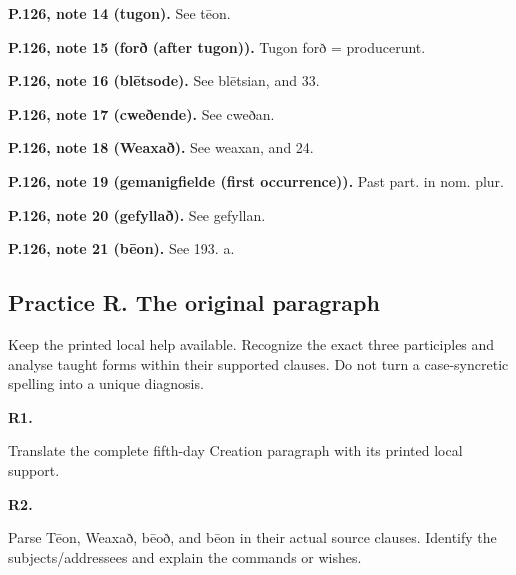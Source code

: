\textbf{P.126, note 14 (tugon).} See tēon.

\textbf{P.126, note 15 (forð (after tugon)).} Tugon forð = producerunt.

\textbf{P.126, note 16 (blētsode).} See blētsian, and 33.

\textbf{P.126, note 17 (cweðende).} See cweðan.

\textbf{P.126, note 18 (Weaxað).} See weaxan, and 24.

\textbf{P.126, note 19 (gemanigfielde (first occurrence)).} Past part. in nom. plur.

\textbf{P.126, note 20 (gefyllað).} See gefyllan.

\textbf{P.126, note 21 (bēon).} See 193. a.

\subsection*{Practice R. The original paragraph}

Keep the printed local help available. Recognize the exact three participles and analyse taught forms within their supported clauses. Do not turn a case-syncretic spelling into a unique diagnosis.

\par\begin{minipage}{\linewidth}\raggedright
\textbf{R1.}

Translate the complete fifth-day Creation paragraph with its printed local support.

\end{minipage}\par\addvspace{4pt}

\par\begin{minipage}{\linewidth}\raggedright
\textbf{R2.}

Parse Tēon, Weaxað, bēoð, and bēon in their actual source clauses. Identify the subjects/\allowbreak{}addressees and explain the commands or wishes.

\end{minipage}\par\addvspace{4pt}

